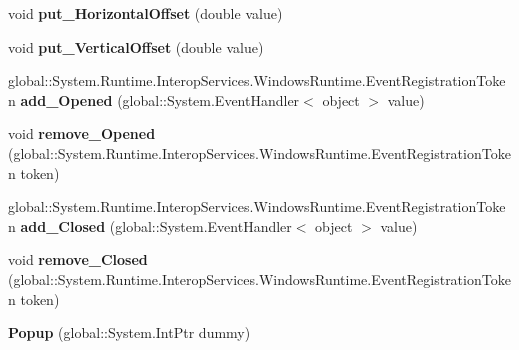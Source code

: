 \begin{DoxyCompactItemize}
void {\bfseries put\+\_\+\+Horizontal\+Offset} (double value)
\item 
\mbox{\label{class_windows_1_1_u_i_1_1_xaml_1_1_controls_1_1_primitives_1_1_popup_ae5934841bb34664eff76c0d774136250}} 
void {\bfseries put\+\_\+\+Vertical\+Offset} (double value)
\item 
\mbox{\label{class_windows_1_1_u_i_1_1_xaml_1_1_controls_1_1_primitives_1_1_popup_a8b0251aa9963ecedfdcfe3e2def06542}} 
global\+::\+System.\+Runtime.\+Interop\+Services.\+Windows\+Runtime.\+Event\+Registration\+Token {\bfseries add\+\_\+\+Opened} (global\+::\+System.\+Event\+Handler$<$ object $>$ value)
\item 
\mbox{\label{class_windows_1_1_u_i_1_1_xaml_1_1_controls_1_1_primitives_1_1_popup_aac5bdd545f4a48100c8fa489c320115d}} 
void {\bfseries remove\+\_\+\+Opened} (global\+::\+System.\+Runtime.\+Interop\+Services.\+Windows\+Runtime.\+Event\+Registration\+Token token)
\item 
\mbox{\label{class_windows_1_1_u_i_1_1_xaml_1_1_controls_1_1_primitives_1_1_popup_aab8f3210f2e0f3757fa03b86108c4603}} 
global\+::\+System.\+Runtime.\+Interop\+Services.\+Windows\+Runtime.\+Event\+Registration\+Token {\bfseries add\+\_\+\+Closed} (global\+::\+System.\+Event\+Handler$<$ object $>$ value)
\item 
\mbox{\label{class_windows_1_1_u_i_1_1_xaml_1_1_controls_1_1_primitives_1_1_popup_a6296c37154aa1e45ab4075199c3672ed}} 
void {\bfseries remove\+\_\+\+Closed} (global\+::\+System.\+Runtime.\+Interop\+Services.\+Windows\+Runtime.\+Event\+Registration\+Token token)
\item 
\mbox{\label{class_windows_1_1_u_i_1_1_xaml_1_1_controls_1_1_primitives_1_1_popup_a4eb29b9974f43030c2c16d2c04ff7121}} 
{\bfseries Popup} (global\+::\+System.\+Int\+Ptr dummy)
\end{DoxyCompactItemize}
